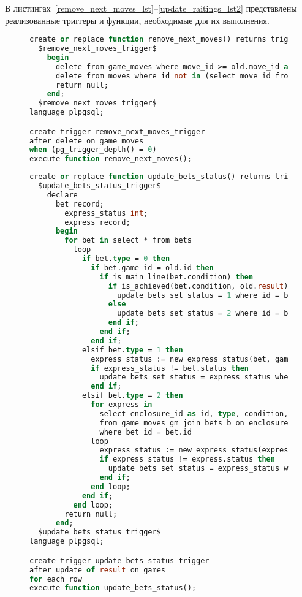 В листингах~\ref{remove_next_moves_lst}--\ref{update_raitings_lst2} представлены реализованные триггеры и функции, необходимые для их выполнения.
\begin{figure}[H]
	\begin{lstlisting}[label=remove_next_moves_lst,caption=Триггер удаления ходов из шхатманой партии,language=Caml]
create or replace function remove_next_moves() returns trigger as
  $remove_next_moves_trigger$
    begin
      delete from game_moves where move_id >= old.move_id and game_id = old.game_id;
      delete from moves where id not in (select move_id from game_moves);
      return null;
    end;
  $remove_next_moves_trigger$
language plpgsql;

create trigger remove_next_moves_trigger
after delete on game_moves
when (pg_trigger_depth() = 0)
execute function remove_next_moves();
	\end{lstlisting}
\end{figure}
\begin{figure}[H]
	\begin{lstlisting}[label=update_bets_status_lst,caption=Триггер проверки выполнения условий ставок,language=Caml]
create or replace function update_bets_status() returns trigger as 
  $update_bets_status_trigger$
    declare
      bet record;
        express_status int;
        express record;
      begin 
        for bet in select * from bets
          loop
            if bet.type = 0 then
              if bet.game_id = old.id then
                if is_main_line(bet.condition) then
                  if is_achieved(bet.condition, old.result) then
                    update bets set status = 1 where id = bet.id;
                  else
                    update bets set status = 2 where id = bet.id;
                  end if;
                end if;
              end if;
            elsif bet.type = 1 then
              express_status := new_express_status(bet, game);
              if express_status != bet.status then
                update bets set status = express_status where id = bet.id;
              end if;
            elsif bet.type = 2 then
              for express in
                select enclosure_id as id, type, condition, coefficient, status, game_id
                from game_moves gm join bets b on enclosure_id = id
                where bet_id = bet.id
              loop
                express_status := new_express_status(express, old);
                if express_status != express.status then
                  update bets set status = express_status where id = express.id;
                end if;
              end loop;
            end if;
          end loop;
        return null;
      end;
  $update_bets_status_trigger$
language plpgsql;

create trigger update_bets_status_trigger
after update of result on games
for each row
execute function update_bets_status();
	\end{lstlisting}
\end{figure}
